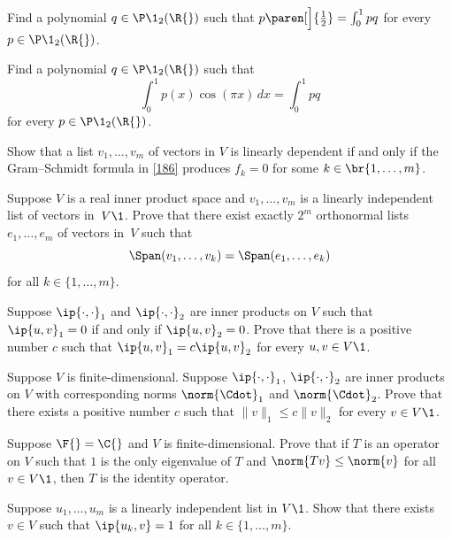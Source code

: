\exercise
Find a polynomial $q \in \P\1_2(\R{})$ such that
$
p\paren[\Big]{\tfrac{1}{2}} = \int_0^1 pq$
for every $p \in \P\1_2(\R{})$.\label{6int}


\exercise
Find a polynomial $q \in \P\1_2(\R{})$ such that
\[
\int_0^1 p(x) \cos(\pi x) \,dx = \int_0^1 pq
\]
for every $p \in \P\1_2(\R{})$.


\exercise
Show that a list $v_1, \ldots, v_m$ of vectors in $V$ is linearly dependent if and only if the Gram--Schmidt formula in \ref{186} produces $f_k= 0$ for some $k \in \br{1, \ldots, m}$.\label{GSlindep}%


\exercise
Suppose $V$ is a real inner product space and $v_1, \dots, v_m$ is a
linearly independent list of vectors in~$V\1$.  Prove that there exist exactly
$2^m$ orthonormal lists $e_1, \dots, e_m$ of vectors
in~$V$ such  that
\[
\Span (v_1, \dots, v_k) = \Span (e_1, \dots, e_k)
\]
for all $k \in \{1, \dots, m\}$.


\exercise
Suppose $\ip{ \cdot, \cdot}_1$ and $\ip{ \cdot, \cdot}_2$ are inner products on $V$ such that $\ip{u,v}_1 = 0$ if and only if $\ip{u,v}_2= 0$. Prove that there is a positive number $c$ such that $\ip{u, v}_1 = c \ip{u, v}_2$ for every $u, v \in V\1$.


\exercise
Suppose $V$ is finite-dimensional. Suppose $\ip{ \cdot, \cdot}_1$, $\ip{ \cdot, \cdot}_2$ are inner products on $V$ with corresponding norms $\norm{ \Cdot }_1$ and $\norm{\Cdot}_2$. Prove that there exists a positive number $c$ such that
$
\| v \|_1 \le c \| v \|_2
$
for every $v \in V\1$.


\exercise
Suppose $\F{} = \C{}$ and $V$ is finite-dimensional. Prove that if $T$ is an operator on $V$ such that $1$ is the only eigenvalue of $T$ and $\norm{Tv} \le \norm{v}$ for all $v \in V\1$, then $T$ is the identity operator.


\exercise
Suppose $u_1, \dots, u_m$ is a linearly independent list in $V\1$. Show that there exists $v \in V$ such that $\ip{u_k, v} =1$
for all $k \in \{1, \dots, m\}$.


